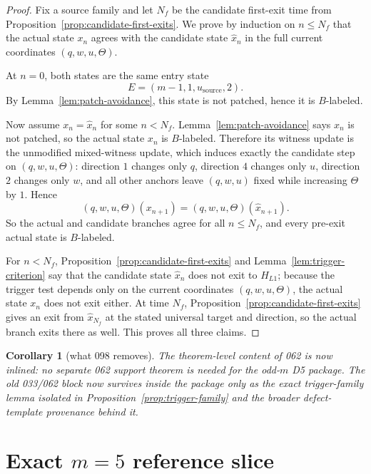 \documentclass[11pt]{article}
\newtheorem{corollary}[theorem]{Corollary}
\begin{document}
\begin{proof}
Fix a source family and let $N_f$ be the candidate first-exit time from
Proposition~\ref{prop:candidate-first-exits}.
We prove by induction on $n\le N_f$ that the actual state $x_n$ agrees with the
candidate state $\widehat x_n$ in the full current coordinates
$(q,w,u,\Theta)$.

At $n=0$, both states are the same entry state
\[
E=(m-1,1,u_{\mathrm{source}},2).
\]
By Lemma~\ref{lem:patch-avoidance}, this state is not patched, hence it is
$B$-labeled.

Now assume $x_n=\widehat x_n$ for some $n<N_f$.
Lemma~\ref{lem:patch-avoidance} says $\widehat x_n$ is not patched, so the
actual state $x_n$ is $B$-labeled.
Therefore its witness update is the unmodified mixed-witness update, which
induces exactly the candidate step on $(q,w,u,\Theta)$: direction $1$ changes
only $q$, direction $4$ changes only $u$, direction $2$ changes only $w$, and
all other anchors leave $(q,w,u)$ fixed while increasing $\Theta$ by $1$.
Hence
\[
(q,w,u,\Theta)(x_{n+1})=(q,w,u,\Theta)(\widehat x_{n+1}).
\]
So the actual and candidate branches agree for all $n\le N_f$, and every
pre-exit actual state is $B$-labeled.

For $n<N_f$, Proposition~\ref{prop:candidate-first-exits} and
Lemma~\ref{lem:trigger-criterion} say that the candidate state
$\widehat x_n$ does not exit to $H_{L1}$; because the trigger test depends only
on the current coordinates $(q,w,u,\Theta)$, the actual state $x_n$ does not
exit either.
At time $N_f$, Proposition~\ref{prop:candidate-first-exits} gives an exit from
$\widehat x_{N_f}$ at the stated universal target and direction, so the actual
branch exits there as well.
This proves all three claims.
\end{proof}

\begin{corollary}[what 098 removes]
The theorem-level content of 062 is now inlined: no separate 062 support theorem
is needed for the odd-$m$ D5 package.
The old 033/062 block now survives inside the package only as the exact
trigger-family lemma isolated in Proposition~\ref{prop:trigger-family} and the
broader defect-template provenance behind it.
\end{corollary}

\section{Exact $m=5$ reference slice}
\end{document}
